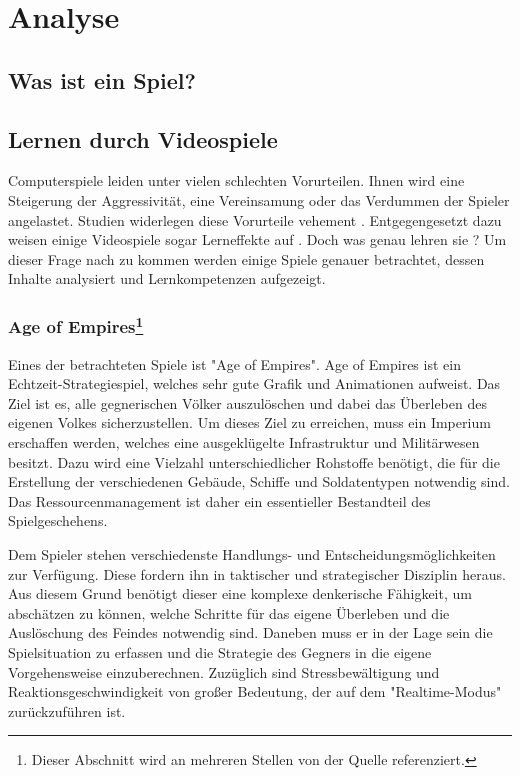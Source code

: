 \section{Analyse}
\subsection{Was ist ein Spiel?}
\subsection{Lernen durch Videospiele}
Computerspiele leiden unter vielen schlechten Vorurteilen. Ihnen wird eine Steigerung der Aggressivität, eine Vereinsamung oder das Verdummen der Spieler angelastet. Studien widerlegen diese Vorurteile vehement \cite{psylex.de2012}. Entgegengesetzt dazu weisen einige Videospiele sogar Lerneffekte auf \cite{paradisiredaktion2010}. Doch was genau lehren sie ? Um dieser Frage nach zu kommen werden einige Spiele genauer betrachtet, dessen Inhalte analysiert und Lernkompetenzen aufgezeigt.

\subsubsection[Age of Empires]{Age of Empires\footnote{Dieser Abschnitt wird an mehreren Stellen von der Quelle \cite{bundeszentralefuerpolitischebildung2005} referenziert.}}
Eines der betrachteten Spiele ist "{}Age of Empires"{}. Age of Empires ist ein Echtzeit-Strategiespiel, welches sehr gute Grafik und Animationen aufweist. Das Ziel ist es, alle gegnerischen Völker auszulöschen und dabei das Überleben des eigenen Volkes sicherzustellen. Um dieses Ziel zu erreichen, muss ein Imperium erschaffen werden, welches eine ausgeklügelte Infrastruktur und Militärwesen besitzt. Dazu wird eine Vielzahl unterschiedlicher Rohstoffe benötigt, die für die Erstellung der verschiedenen Gebäude, Schiffe und Soldatentypen notwendig sind. Das Ressourcenmanagement ist daher ein essentieller Bestandteil des Spielgeschehens.

Dem Spieler stehen verschiedenste Handlungs- und Entscheidungsmöglichkeiten zur Verfügung. Diese fordern ihn in taktischer und strategischer Disziplin heraus. Aus diesem Grund benötigt dieser eine komplexe denkerische Fähigkeit, um abschätzen zu können, welche Schritte für das eigene Überleben und die Auslöschung des Feindes notwendig sind. Daneben muss er in der Lage sein die Spielsituation zu erfassen und die Strategie des Gegners in die eigene Vorgehensweise einzuberechnen. Zuzüglich sind Stressbewältigung und Reaktionsgeschwindigkeit von großer Bedeutung, der auf dem "{}Realtime-Modus"{} zurückzuführen ist. 

